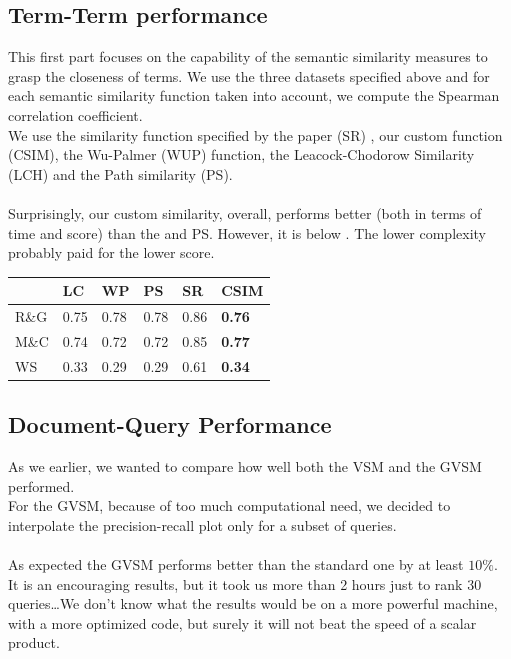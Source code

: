 \documentclass[letterpaper, 10 pt, conference]{ieeeconf}  %
\begin{document}
\subsection{Term-Term performance}
This first part focuses on the capability of the semantic similarity measures to grasp the closeness of terms. We use the three datasets specified above and for each semantic similarity function taken into account, we compute the Spearman correlation coefficient.\\
We use the similarity function specified by the paper (SR) \cite{c1}, our custom function (CSIM), the Wu-Palmer (WUP) \cite{c3} function, the Leacock-Chodorow Similarity (LCH) \cite{c4} and the Path similarity (PS).\\   \\
Surprisingly, our custom similarity, overall, performs better (both in terms of time and score) than the \cite{c3} \cite{c4} and PS. However, it is below \cite{c1}. The lower complexity probably paid for the lower score.
\begin{table}[h]
\centering
\begin{tabular}{l|l|l|l|l|l}
     & LC   & WP   & PS   & SR   & \textbf{CSIM} \\ \hline
R\&G & 0.75 & 0.78 & 0.78 & 0.86 & \textbf{0.76} \\ \hline
M\&C & 0.74 & 0.72 & 0.72 & 0.85 & \textbf{0.77} \\ \hline
WS   & 0.33 & 0.29 & 0.29 & 0.61 & \textbf{0.34}
\end{tabular}
\end{table}
\subsection{Document-Query Performance}
As we earlier, we wanted to compare how well both the VSM and the GVSM performed.\\
For the GVSM, because of too much computational need, we decided to interpolate the precision-recall plot only for a subset of queries.\\
\\
As expected the GVSM performs better than the standard one by at least $10\%$. It is an encouraging results, but it took us more than 2 hours just to rank 30 queries\dots We don't know what the results would be on a more powerful machine, with a more optimized code, but surely it will not beat the speed of a scalar product.
\end{document}
